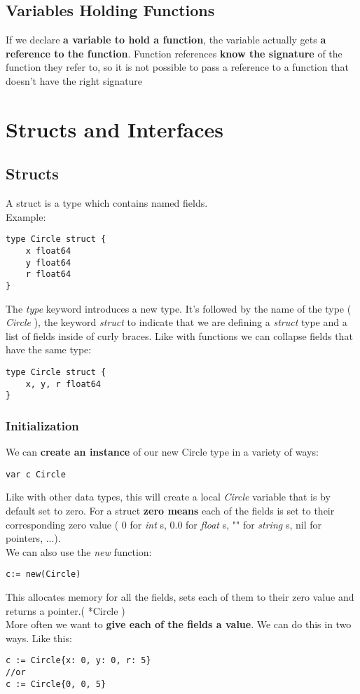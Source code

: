\documentclass[10pt,letterpaper]{report}
\begin{document}
\section{Variables Holding Functions}
If we declare \textbf{a variable to hold a function}, the variable actually gets \textbf{a reference to the function}. Function references \textbf{know the signature} of the function they refer to, so it is not possible to pass a reference to a function that doesn't have the right signature

\chapter{Structs and Interfaces}
\section{Structs}
A struct is a type which contains named fields.\\
Example:
\begin{lstlisting}
type Circle struct {
	x float64
	y float64
	r float64
}
\end{lstlisting}
The \textit{type} keyword introduces a new type. It's followed by the name of the type ( \textit{Circle} ), the keyword \textit{struct} to indicate that we are defining a \textit{struct} type and a list of fields inside of curly braces. Like with functions we can collapse fields that have the same type:
\begin{lstlisting}
type Circle struct {
	x, y, r float64
}
\end{lstlisting}
\subsection{Initialization}
We can \textbf{create an instance} of our new Circle type in a variety of ways:
\begin{lstlisting}
var c Circle
\end{lstlisting}
Like with other data types, this will create a local \textit{Circle} variable that is by default set to zero. For a struct \textbf{zero means} each of the fields is set to their corresponding zero value ( 0 for \textit{int} s, 0.0 for \textit{float} s, "" for \textit{string} s, nil for pointers, ...).\\
We can also use the \textit{new} function:
\begin{lstlisting}
c:= new(Circle)
\end{lstlisting}
This allocates memory for all the fields, sets each of them to their zero value and returns a pointer.( *Circle )\\
More often we want to \textbf{give each of the fields a value}. We can do this in two ways. Like this:
\begin{lstlisting}
c := Circle{x: 0, y: 0, r: 5}
//or
c := Circle{0, 0, 5}
\end{lstlisting}
\end{document}
